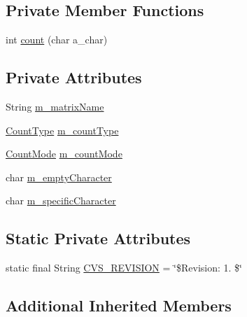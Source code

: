 \subsection*{Private Member Functions}
\begin{DoxyCompactItemize}
\item 
int \hyperlink{classorg_1_1jgap_1_1gp_1_1function_1_1_count_matrix_aa87ada9ecc0deac72a34c731ddd732c7}{count} (char a\-\_\-char)
\end{DoxyCompactItemize}
\subsection*{Private Attributes}
\begin{DoxyCompactItemize}
\item 
String \hyperlink{classorg_1_1jgap_1_1gp_1_1function_1_1_count_matrix_a8a4aaa596857d2e87306129251a9ff83}{m\-\_\-matrix\-Name}
\item 
\hyperlink{enumorg_1_1jgap_1_1gp_1_1function_1_1_count_matrix_1_1_count_type}{Count\-Type} \hyperlink{classorg_1_1jgap_1_1gp_1_1function_1_1_count_matrix_a887dc3a42b519552bb175f496628473c}{m\-\_\-count\-Type}
\item 
\hyperlink{enumorg_1_1jgap_1_1gp_1_1function_1_1_count_matrix_1_1_count_mode}{Count\-Mode} \hyperlink{classorg_1_1jgap_1_1gp_1_1function_1_1_count_matrix_aa6252cd1d406acde92bd1f20e09c7c03}{m\-\_\-count\-Mode}
\item 
char \hyperlink{classorg_1_1jgap_1_1gp_1_1function_1_1_count_matrix_ad70645403e114b27037ef063589d18a9}{m\-\_\-empty\-Character}
\item 
char \hyperlink{classorg_1_1jgap_1_1gp_1_1function_1_1_count_matrix_a2c021d2b7127e90eb2a091f3082915b8}{m\-\_\-specific\-Character}
\end{DoxyCompactItemize}
\subsection*{Static Private Attributes}
\begin{DoxyCompactItemize}
\item 
static final String \hyperlink{classorg_1_1jgap_1_1gp_1_1function_1_1_count_matrix_a072ffe6df38b2f245461b74a9be91852}{C\-V\-S\-\_\-\-R\-E\-V\-I\-S\-I\-O\-N} = \char`\"{}\$Revision\-: 1. \$\char`\"{}
\end{DoxyCompactItemize}
\subsection*{Additional Inherited Members}



